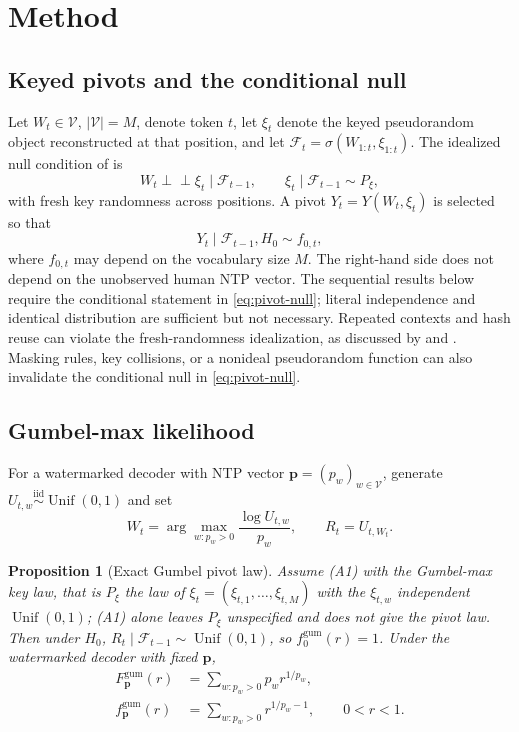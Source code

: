 \documentclass[11pt]{article}
\newtheorem{proposition}{Proposition}
\newcommand{\F}{\mathcal F}
\newcommand{\V}{\mathcal V}
\newcommand{\bP}{\bm p}
\newcommand{\Unif}{\operatorname{Unif}}
\begin{document}
\section{Method}

\subsection{Keyed pivots and the conditional null}
\label{sec:pivots}

Let $W_t\in\V$, $|\V|=M$, denote token $t$, let $\xi_t$ denote the keyed pseudorandom object reconstructed at that position, and let $\F_t=\sigma(W_{1:t},\xi_{1:t})$.  The idealized null condition of \citet{li2025framework} is
\begin{equation*}
  W_t\mathrel{\perp\!\!\!\perp}\xi_t\mid\F_{t-1},
  \qquad
  \xi_t\mid\F_{t-1}\sim P_\xi,
  \tag{A1}
\end{equation*}
with fresh key randomness across positions.  A pivot $Y_t=Y(W_t,\xi_t)$ is selected so that
\begin{equation}
  Y_t\mid\F_{t-1},H_0\sim f_{0,t},
  \label{eq:pivot-null}
\end{equation}
where $f_{0,t}$ may depend on the vocabulary size $M$.  The right-hand side does not depend on the unobserved human NTP vector.  The sequential results below require the conditional statement in \eqref{eq:pivot-null}; literal independence and identical distribution are sufficient but not necessary.  Repeated contexts and hash reuse can violate the fresh-randomness idealization, as discussed by \citet[Section~III-C]{fernandez2023three} and \citet[Appendix~D.1, Remark~D.1]{li2025framework}.  Masking rules, key collisions, or a nonideal pseudorandom function can also invalidate the conditional null in \eqref{eq:pivot-null}.

\subsection{Gumbel-max likelihood}

For a watermarked decoder with NTP vector $\bP=(p_w)_{w\in\V}$, generate $U_{t,w}\stackrel{\mathrm{iid}}{\sim}\Unif(0,1)$ and set
\begin{equation}
  W_t=\arg\max_{w:p_w>0}\frac{\log U_{t,w}}{p_w},
  \qquad R_t=U_{t,W_t}.
\end{equation}

\begin{proposition}[Exact Gumbel pivot law]\label{prop:gumbel}
Assume \textup{(A1)} with the Gumbel-max key law, that is $P_\xi$ the law of $\xi_t=(\xi_{t,1},\ldots,\xi_{t,M})$ with the $\xi_{t,w}$ independent $\Unif(0,1)$; \textup{(A1)} alone leaves $P_\xi$ unspecified and does not give the pivot law.  Then under $H_0$, $R_t\mid\F_{t-1}\sim\Unif(0,1)$, so $f_0^{\mathrm{gum}}(r)=1$.  Under the watermarked decoder with fixed $\bP$,
\begin{align}
  F_{\bP}^{\mathrm{gum}}(r)
    &=\sum_{w:p_w>0}p_w r^{1/p_w}, \\
  f_{\bP}^{\mathrm{gum}}(r)
    &=\sum_{w:p_w>0}r^{1/p_w-1},
  \qquad 0<r<1.
  \label{eq:gumbel-density}
\end{align}
\end{proposition}
\end{document}
